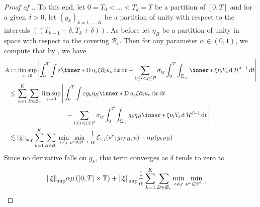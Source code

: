 \begin{proof}[Proof of .]
	To this end, let $ 0 = T_{ 0 } < \dotsc < T_{ k } = T $ be a partition of $ 
	[ 0 , T ] $ and for a given $ \delta > 0 $, let $ ( g_{ k } )_{ k = 1 , 
	\dotsc, K } $ be a partition of unity with respect to the intervals 
	$ \left( ( T_{ k - 1 } - \delta , T_{ k } + \delta ) \right) $. As before 
	let $ \eta_{ B } $ be a partition of unity in space with respect to the 
	covering $ \mathcal{ B }_{ r } $. Then for any parameter $ \alpha \in ( 0 , 
	1 ) $, we compute that by , we have
	\begin{align*}
		A \coloneqq&
		\limsup_{ \varepsilon \to 0 }
			\abs{
				\int_{ 0 }^{ T }
					\int
						\varepsilon
						\inner*{ \diff u_{ \varepsilon } \xi }{ \partial_{ t } 
						u_{ \varepsilon } }
					\dd{ x }
				\dd{ t }
				-
				\sum_{ 1 \leq i < j \leq P }
					\sigma_{ i j }
					\int_{ 0 }^{ T }
						\int_{ \Sigma_{ i j } }
							\inner*{ \xi }{ \nu_{ i } }
							V_{ i }
						\dd{ \hm^{ d -1 } }
					\dd{ t }
			}
		\\
		\leq{} &
		\sum_{ k = 1 }^{ K }
			\sum_{ B \in \mathcal{ B }_{ r } }
				\limsup_{ \varepsilon \to 0 }
					\Bigg{|}
						\int_{ 0 }^{ T }
							\int
								\varepsilon
								g_{ k } \eta_{ B }
								\inner*{ \diff u_{ \varepsilon } \xi }{ 
								\partial_{ t } u_{ \varepsilon } }
							\dd{ x }
						\dd{ t }
		\\
						& \qquad \qquad \qquad \qquad-
						\sum_{ 1 \leq i < j \leq P }
							\sigma_{ i j }
							\int_{ 0 }^{ T }
								\int_{ \Sigma_{ i j } }
									g_{ k } \eta_{ B }
									\inner*{\xi }{ \nu_{ i } }
									V_{ i }
								\dd{ \hm^{ d - 1 } }
							\dd{ t }					
					\Bigg{|}
		\\
		\lesssim{} &
		\norm{ \xi }_{ \mathrm{sup} }
		\sum_{ k = 1 }^{ K }
			\sum_{ B \in \mathcal{ B }_{ r } }
				\min_{ i \neq j }
					\min_{ \nu^{ \ast } \in \mathbb{ S }^{ d - 1 } }
						\frac{ 1 }{ \alpha }
						\tilt_excess_{ i , j } ( \nu^{ \ast } ; g_{ k } \rho_{ 
						B } , u )
						+
						\alpha \mu ( g_{ k } \rho_{ B } )
	\end{align*}
	Since no derivative falls on $ g_{ k } $, this term converges as $ \delta $ 
	tends to zero to
	\begin{align}
		\label{error_for _convergence_of_velocity}
		\norm{ \xi }_{ \mathrm{sup} }
		\alpha \mu \left( [ 0 , T ] \times \flattorus \right)
		+
		\norm{ \xi }_{ \mathrm{sup} }
		\frac{ 1 }{ \alpha }
		\sum_{ k = 1 }^{ K }
			\sum_{ B \in \mathcal{ B }_{ r } }
				& \min_{ i \neq j }
					\min_{ \nu^{ \ast } \in \mathbb{ S }^{ d - 1 } }

\end{align}
\end{proof}
